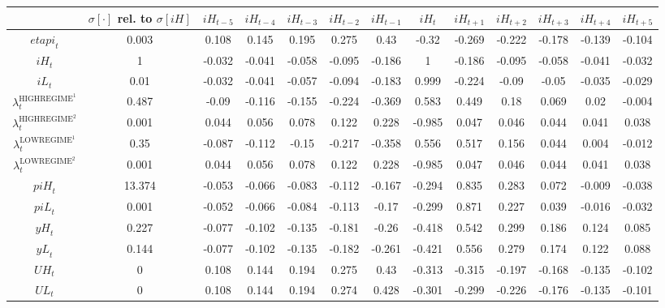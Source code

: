 \begin{tabular}{c|c|c|c|c|c|c|c|c|c|c|c|c|}
  & $\sigma[\cdot]$ rel. to $\sigma[{i\!H}]$ & ${i\!H}_{t-5}$ & ${i\!H}_{t-4}$ & ${i\!H}_{t-3}$ & ${i\!H}_{t-2}$ & ${i\!H}_{t-1}$ & ${i\!H}_{t}$ & ${i\!H}_{t+1}$ & ${i\!H}_{t+2}$ & ${i\!H}_{t+3}$ & ${i\!H}_{t+4}$ & ${i\!H}_{t+5}$\\
\hline
${e\!t\!a\!p\!i}_{t}$ & 0.003 & 0.108 & 0.145 & 0.195 & 0.275 & 0.43 & -0.32 & -0.269 & -0.222 & -0.178 & -0.139 & -0.104 \\
${i\!H}_{t}$ & 1 & -0.032 & -0.041 & -0.058 & -0.095 & -0.186 & 1 & -0.186 & -0.095 & -0.058 & -0.041 & -0.032 \\
${i\!L}_{t}$ & 0.01 & -0.032 & -0.041 & -0.057 & -0.094 & -0.183 & 0.999 & -0.224 & -0.09 & -0.05 & -0.035 & -0.029 \\
$\lambda^{\mathrm{HIGHREGIME}^{\mathrm{1}}}_{t}$ & 0.487 & -0.09 & -0.116 & -0.155 & -0.224 & -0.369 & 0.583 & 0.449 & 0.18 & 0.069 & 0.02 & -0.004 \\
$\lambda^{\mathrm{HIGHREGIME}^{\mathrm{2}}}_{t}$ & 0.001 & 0.044 & 0.056 & 0.078 & 0.122 & 0.228 & -0.985 & 0.047 & 0.046 & 0.044 & 0.041 & 0.038 \\
$\lambda^{\mathrm{LOWREGIME}^{\mathrm{1}}}_{t}$ & 0.35 & -0.087 & -0.112 & -0.15 & -0.217 & -0.358 & 0.556 & 0.517 & 0.156 & 0.044 & 0.004 & -0.012 \\
$\lambda^{\mathrm{LOWREGIME}^{\mathrm{2}}}_{t}$ & 0.001 & 0.044 & 0.056 & 0.078 & 0.122 & 0.228 & -0.985 & 0.047 & 0.046 & 0.044 & 0.041 & 0.038 \\
${p\!i\!H}_{t}$ & 13.374 & -0.053 & -0.066 & -0.083 & -0.112 & -0.167 & -0.294 & 0.835 & 0.283 & 0.072 & -0.009 & -0.038 \\
${p\!i\!L}_{t}$ & 0.001 & -0.052 & -0.066 & -0.084 & -0.113 & -0.17 & -0.299 & 0.871 & 0.227 & 0.039 & -0.016 & -0.032 \\
${y\!H}_{t}$ & 0.227 & -0.077 & -0.102 & -0.135 & -0.181 & -0.26 & -0.418 & 0.542 & 0.299 & 0.186 & 0.124 & 0.085 \\
${y\!L}_{t}$ & 0.144 & -0.077 & -0.102 & -0.135 & -0.182 & -0.261 & -0.421 & 0.556 & 0.279 & 0.174 & 0.122 & 0.088 \\
${U\!H}_{t}$ & 0 & 0.108 & 0.144 & 0.194 & 0.275 & 0.43 & -0.313 & -0.315 & -0.197 & -0.168 & -0.135 & -0.102 \\
${U\!L}_{t}$ & 0 & 0.108 & 0.144 & 0.194 & 0.274 & 0.428 & -0.301 & -0.299 & -0.226 & -0.176 & -0.135 & -0.101 \\
\hline
\end{tabular}


